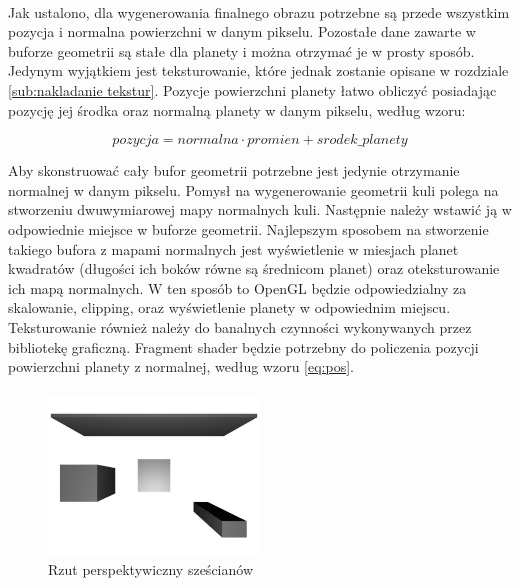 \paragraph{}

Jak ustalono, dla wygenerowania finalnego obrazu potrzebne są przede wszystkim pozycja i normalna powierzchni w danym pikselu. Pozostałe dane zawarte w buforze geometrii są stałe dla planety i można otrzymać je w prosty sposób. Jedynym wyjątkiem jest teksturowanie, które jednak zostanie opisane w rozdziale \hyperref[sub:nakladanie tekstur]{\ref{sub:nakladanie tekstur}}. Pozycje powierzchni planety łatwo obliczyć posiadając pozycję jej środka oraz normalną planety w danym pikselu, według wzoru:

\begin{equation} \label{eq:pos}
pozycja = normalna \cdot promien + srodek\_planety
\end{equation}

Aby skonstruować cały bufor geometrii potrzebne jest jedynie otrzymanie normalnej w danym pikselu. Pomysł na wygenerowanie geometrii kuli polega na stworzeniu dwuwymiarowej mapy normalnych kuli. Następnie należy wstawić ją w odpowiednie miejsce w buforze geometrii. Najlepszym sposobem na stworzenie takiego bufora z mapami normalnych jest wyświetlenie w miesjach planet kwadratów (długości ich boków równe są średnicom planet) oraz oteksturowanie ich mapą normalnych. W ten sposób to OpenGL będzie odpowiedzialny za skalowanie, clipping, oraz wyświetlenie planety w odpowiednim miejscu. Teksturowanie również należy do banalnych czynności wykonywanych przez bibliotekę graficzną. Fragment shader będzie potrzebny do policzenia pozycji powierzchni planety z normalnej, według wzoru \hyperref[eq:pos]{\ref{eq:pos}}.

\paragraph{}

\begin{figure}
\centering
	\includegraphics[width=0.5\textwidth]{img/proj_rend.jpg}
\caption{Rzut perspektywiczny sześcianów}
\label{fig:proj}
\end{figure}

